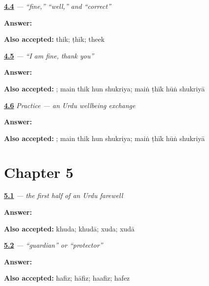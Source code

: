 \noindent\begin{minipage}[t]{\linewidth}
\raggedright
\hyperlink{review-UR-C04-thik-well}{\textbf{4.4}} \emph{ — “fine,” “well,” and “correct”}\par
\small \textbf{Answer:} \par
\footnotesize \textbf{Also accepted:} thik; ṭhīk; theek
\end{minipage}\par\medskip

\noindent\begin{minipage}[t]{\linewidth}
\raggedright
\hyperlink{review-UR-C04-main-thik-hun-reply}{\textbf{4.5}} \emph{    — “I am fine, thank you”}\par
\small \textbf{Answer:}    \par
\footnotesize \textbf{Also accepted:}    ; main thik hun shukriya; maiṅ ṭhīk hūṅ shukriyā
\end{minipage}\par\medskip

\noindent\begin{minipage}[t]{\linewidth}
\raggedright
\hyperlink{review-UR-C04-practice-next-line}{\textbf{4.6}} \emph{Practice — an Urdu wellbeing exchange}\par
\small \textbf{Answer:}    \par
\footnotesize \textbf{Also accepted:}    ; main thik hun shukriya; maiṅ ṭhīk hūṅ shukriyā
\end{minipage}\par\medskip

\section*{Chapter 5}

\noindent\begin{minipage}[t]{\linewidth}
\raggedright
\hyperlink{review-UR-C05-khuda-meaning}{\textbf{5.1}} \emph{ — the first half of an Urdu farewell}\par
\small \textbf{Answer:} \par
\footnotesize \textbf{Also accepted:} khuda; khudā; xuda; xudā
\end{minipage}\par\medskip

\noindent\begin{minipage}[t]{\linewidth}
\raggedright
\hyperlink{review-UR-C05-hafiz-meaning}{\textbf{5.2}} \emph{ — “guardian” or “protector”}\par
\small \textbf{Answer:} \par
\footnotesize \textbf{Also accepted:} hafiz; hāfiz; haafiz; hafez
\end{minipage}\par\medskip

